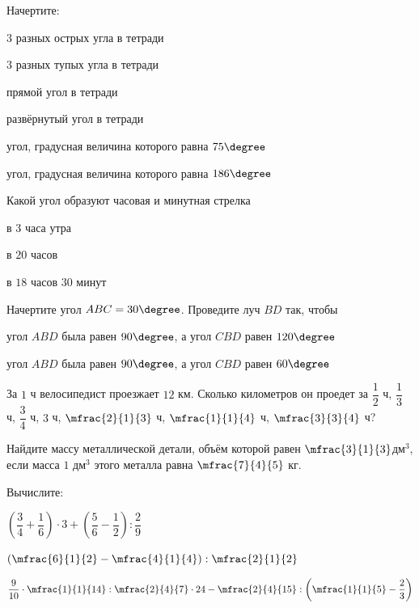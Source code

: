 %
%
\begin{class}[number=6]
	\begin{listofex}
		\item Начертите:
		\begin{enumcols}[itemcolumns=1]
		\item \( 3 \) разных острых угла в тетради
		\item \( 3 \) разных тупых угла в тетради
		\item прямой угол в тетради
		\item развёрнутый угол в тетради
		\item угол, градусная величина которого равна \( 75\degree \)
		\item угол, градусная величина которого равна \( 186\degree \)
			\end{enumcols}
		\item Какой угол образуют часовая и минутная стрелка
		\begin{enumcols}[itemcolumns=1]
			\item в \( 3 \) часа утра
			\item в \( 20 \) часов
			\item в \( 18 \) часов \( 30 \) минут
		\end{enumcols}
	\item Начертите угол \( ABC=30\degree \). Проведите луч \( BD \) так, чтобы 
	\begin{enumcols}[itemcolumns=1]
		\item угол \( ABD \) была равен \( 90\degree \), а угол \( CBD \) равен \( 120\degree \)
		\item угол \( ABD \) была равен \( 90\degree \), а угол \( CBD \) равен \( 60\degree \)
	\end{enumcols}
	\item За \( 1 \) ч велосипедист проезжает \( 12 \) км. Сколько километров он проедет за \( \dfrac{1}{2} \) ч, \( \dfrac{1}{3} \) ч, \( \dfrac{3}{4} \) ч, \( 3 \) ч, \( \mfrac{2}{1}{3} \) ч, \( \mfrac{1}{1}{4} \) ч, \( \mfrac{3}{3}{4} \) ч?
	\item Найдите массу металлической детали, объём которой равен \( \mfrac{3}{1}{3} \)дм\( ^3 \), если масса \( 1 \) дм\( ^3\) этого металла равна \( \mfrac{7}{4}{5} \) кг.
	\item Вычислите:
	\begin{enumcols}[itemcolumns=2]
		\item \( \left( \dfrac{3}{4}+\dfrac{1}{6} \right)\cdot3+\left( \dfrac{5}{6}-\dfrac{1}{2} \right):\dfrac{2}{9} \)
		\item \( \left( \mfrac{6}{1}{2}-\mfrac{4}{1}{4} \right):\mfrac{2}{1}{2} \)
		\item \( \dfrac{9}{10}\cdot\mfrac{1}{1}{14}:\mfrac{2}{4}{7}\cdot24-\mfrac{2}{4}{15}:\left( \mfrac{1}{1}{5}-\dfrac{2}{3} \right) \)
	\end{enumcols}
	\end{listofex}
\end{class}
